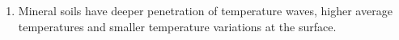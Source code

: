 \documentclass[11pt]{article}
\begin{document}
\begin{enumerate}
\item Mineral soils have deeper penetration of temperature waves,
higher average temperatures and smaller temperature variations at
the surface.



\end{enumerate}
\end{document}
